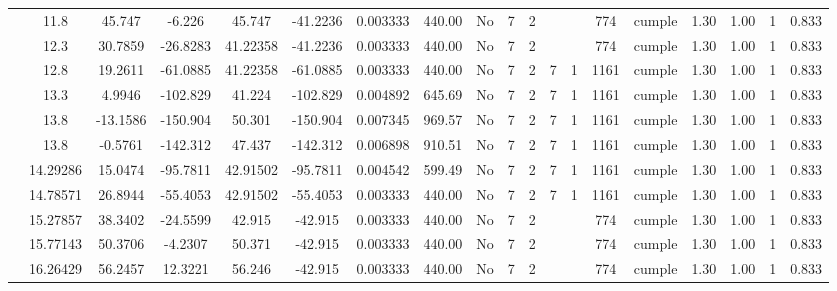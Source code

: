 \begin{table}[H]
{\begin{tabular}{|c|c|c|c|c|c|r|c|c|c|c|c|c|c|c|c|c|c|c|}
\cline{2-19}    & 11.8 & 45.747 & -6.226 & 45.747 & -41.2236 & 0.003333 & 440.00 & No  & 7   & 2   &     &     & 774 & \cellcolor[rgb]{ .776,  .937,  .808}cumple & 1.30 & 1.00 & 1   & 0.833 \bigstrut\\
\cline{2-19}    & 12.3 & 30.7859 & -26.8283 & 41.22358 & -41.2236 & 0.003333 & 440.00 & No  & 7   & 2   &     &     & 774 & \cellcolor[rgb]{ .776,  .937,  .808}cumple & 1.30 & 1.00 & 1   & 0.833 \bigstrut\\
\cline{2-19}    & 12.8 & 19.2611 & -61.0885 & 41.22358 & -61.0885 & 0.003333 & 440.00 & No  & 7   & 2   & 7   & 1   & 1161 & \cellcolor[rgb]{ .776,  .937,  .808}cumple & 1.30 & 1.00 & 1   & 0.833 \bigstrut\\
\cline{2-19}    & 13.3 & 4.9946 & -102.829 & 41.224 & -102.829 & 0.004892 & 645.69 & No  & 7   & 2   & 7   & 1   & 1161 & \cellcolor[rgb]{ .776,  .937,  .808}cumple & 1.30 & 1.00 & 1   & 0.833 \bigstrut\\
\cline{2-19}    & \cellcolor[rgb]{ .851,  .882,  .949}13.8 & -13.1586 & -150.904 & 50.301 & -150.904 & 0.007345 & 969.57 & No  & 7   & 2   & 7   & 1   & 1161 & \cellcolor[rgb]{ .776,  .937,  .808}cumple & 1.30 & 1.00 & 1   & 0.833 \bigstrut\\
\cline{2-19}    & \cellcolor[rgb]{ .851,  .882,  .949}13.8 & -0.5761 & -142.312 & 47.437 & -142.312 & 0.006898 & 910.51 & No  & 7   & 2   & 7   & 1   & 1161 & \cellcolor[rgb]{ .776,  .937,  .808}cumple & 1.30 & 1.00 & 1   & 0.833 \bigstrut\\
\cline{2-19}    & 14.29286 & 15.0474 & -95.7811 & 42.91502 & -95.7811 & 0.004542 & 599.49 & No  & 7   & 2   & 7   & 1   & 1161 & \cellcolor[rgb]{ .776,  .937,  .808}cumple & 1.30 & 1.00 & 1   & 0.833 \bigstrut\\
\cline{2-19}    & 14.78571 & 26.8944 & -55.4053 & 42.91502 & -55.4053 & 0.003333 & 440.00 & No  & 7   & 2   & 7   & 1   & 1161 & \cellcolor[rgb]{ .776,  .937,  .808}cumple & 1.30 & 1.00 & 1   & 0.833 \bigstrut\\
\cline{2-19}    & 15.27857 & 38.3402 & -24.5599 & 42.915 & -42.915 & 0.003333 & 440.00 & No  & 7   & 2   &     &     & 774 & \cellcolor[rgb]{ .776,  .937,  .808}cumple & 1.30 & 1.00 & 1   & 0.833 \bigstrut\\
\cline{2-19}    & 15.77143 & 50.3706 & -4.2307 & 50.371 & -42.915 & 0.003333 & 440.00 & No  & 7   & 2   &     &     & 774 & \cellcolor[rgb]{ .776,  .937,  .808}cumple & 1.30 & 1.00 & 1   & 0.833 \bigstrut\\
\cline{2-19}    & 16.26429 & 56.2457 & 12.3221 & 56.246 & -42.915 & 0.003333 & 440.00 & No  & 7   & 2   &     &     & 774 & \cellcolor[rgb]{ .776,  .937,  .808}cumple & 1.30 & 1.00 & 1   & 0.833 \bigstrut\\

\end{tabular}}
\end{table}
